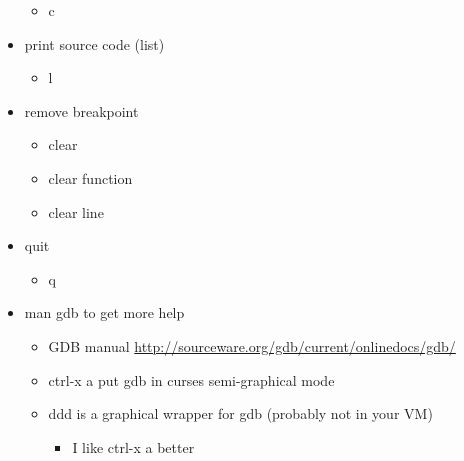\documentclass[11pt]{article}
\begin{document}
\begin{itemize}
\begin{itemize}
\item c
\end{itemize}
\item print source code (list)
\begin{itemize}
\item l
\end{itemize}
\item remove breakpoint
\begin{itemize}
\item clear
\item clear function
\item clear line
\end{itemize}
\item quit
\begin{itemize}
\item q
\end{itemize}
\item man gdb to get more help
\begin{itemize}
\item GDB manual \url{http://sourceware.org/gdb/current/onlinedocs/gdb/}
\item ctrl-x a put gdb in curses semi-graphical mode
\item ddd is a graphical wrapper for gdb (probably not in your VM)
\begin{itemize}
\item I like ctrl-x a better
\end{itemize}
\end{itemize}
\end{itemize}
\end{document}
